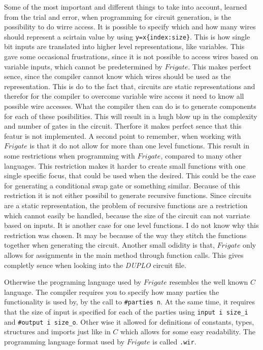 \documentclass[twoside,11pt,openright]{report}
\newcommand{\DUPLO}{\textit{DUPLO} }
\begin{document}
Some of the most important and different things to take into account, learned from the trial and error, when programming for circuit generation, is the possibility to do wirre access. It is possible to specify which and how many wires should represent a scirtain value by using \verb|y=x{index:size}|. This is how single bit inputs are translated into higher level representations, like variables. This gave some occasional frustrations, since it is not possible to access wires based on variable inputs, which cannot be predetermined by $Frigate$. This makes perfect sence, since the compiler cannot know which wires should be used as the representation. This is do to the fact that, circuits are static representations and therefor for the compiler to overcome variable wire access it need to know all possible wire accesses. What the compiler then can do is to generate components for each of these posibilities. This will result in a hugh blow up in the complexity and number of gates in the circuit. Therfore it makes perfect sence that this featur is not implemented.
A second point to remember, when working with $Frigate$ is that it do not allow for more than one level functions. This result in some restrictions when programming with $Frigate$, compared to many other languages. This restriction makes it harder to create small functions with one single specific focus, that could be used when the desired. This could be the case for generating a conditional swap gate or something similar. Because of this restriction it is not either possibil to generate recursive functions. Since circuits are a static representation, the problem of recursive functions are a restriction which cannot easily be handled, because the size of the circuit can not varriate based on inputs. It is another case for one level functions. I do not know why this restriction was chosen. It may be because of the way they stitch the functions together when generating the circuit. 
Another small odidity is that, $Frigate$ only allows for assignments in the main method through function calls. This gives completly sence when looking into the \DUPLO circuit file.

Otherwise the programing language used by $Frigate$ resembles the well known $C$ language. The compiler requires you to specify how many parties the functionality is used by, by the call to \verb|#parties n|. At the same time, it requires that the size of input is specified for each of the parties using \verb|input i size_i| and \verb|#output i size_o|. Other wise it allowed for definitions of constants, types, structures and imports just like in $C$ which allows for some easy readability. The programming language format used by $Frigate$ is called \verb|.wir|.
\end{document}
